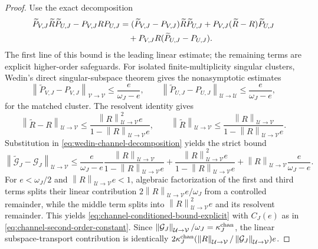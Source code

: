 \documentclass[review]{siamart220329}
\theoremstyle{definition}
\theoremstyle{remark}
\newcommand{\calU}{\mathcal{U}}
\newcommand{\calV}{\mathcal{V}}
\newcommand{\norm}[1]{\left\lVert #1\right\rVert}
\begin{document}
\begin{proof}
Use the exact decomposition
\begin{align}
\widetilde P_{V,J}\widetilde R\widetilde P_{U,J}-P_{V,J}RP_{U,J}
&=(\widetilde P_{V,J}-P_{V,J})\widetilde R\widetilde P_{U,J}
  +P_{V,J}(\widetilde R-R)\widetilde P_{U,J}  \notag\\
&\quad +P_{V,J}R(\widetilde P_{U,J}-P_{U,J}).
\label{eq:wedin-channel-decomposition}
\end{align}
The first line of this bound is the leading linear estimate; the remaining terms are explicit higher-order safeguards.
For isolated finite-multiplicity singular clusters, Wedin's direct singular-subspace theorem gives the nonasymptotic estimates
\begin{equation}
    \norm{\widetilde P_{V,J}-P_{V,J}}_{\calV\to\calV}\leq \frac{e}{\omega_J-e},
    \qquad
    \norm{\widetilde P_{U,J}-P_{U,J}}_{\calU\to\calU}\leq \frac{e}{\omega_J-e},
    \label{eq:direct-wedin-projector}
\end{equation}
for the matched cluster. The resolvent identity gives
\begin{equation}
    \norm{\widetilde R-R}_{\calU\to\calV}\leq
    \frac{\norm{R}_{\calU\to\calV}^2e}{1-\norm{R}_{\calU\to\calV}e},
    \qquad \norm{\widetilde R}_{\calU\to\calV}\leq \frac{\norm{R}_{\calU\to\calV}}{1-\norm{R}_{\calU\to\calV}e}.
    \label{eq:resolvent-nonasymptotic}
\end{equation}
Substitution in \eqref{eq:wedin-channel-decomposition} yields the strict bound
\begin{equation}
    \norm{\widetilde{\mathcal G}_J-\mathcal G_J}_{\calU\to\calV}
    \leq
    \frac{e}{\omega_J-e}\frac{\norm{R}_{\calU\to\calV}}{1-\norm{R}_{\calU\to\calV}e}
    +\frac{\norm{R}_{\calU\to\calV}^2e}{1-\norm{R}_{\calU\to\calV}e}
    +\norm{R}_{\calU\to\calV}\frac{e}{\omega_J-e}.
    \label{eq:channel-bound-nonasymptotic}
\end{equation}
For $e<\omega_J/2$ and $\norm{R}_{\calU\to\calV}e<1$, algebraic factorization of the first and third terms splits their linear contribution $2\norm{R}_{\calU\to\calV}e/\omega_J$ from a controlled remainder, while the middle term splits into $\norm{R}_{\calU\to\calV}^2e$ and its resolvent remainder. This yields \eqref{eq:channel-conditioned-bound-explicit} with $C_J(e)$ as in \eqref{eq:channel-second-order-constant}. Since $\norm{\mathcal G_J}_{\calU\to\calV}/\omega_J=\kappa_J^{\rm chan}$, the linear subspace-transport contribution is identically $2\kappa_J^{\rm chan}(\norm{R}_{\calU\to\calV}/\norm{\mathcal G_J}_{\calU\to\calV})e$.
\end{proof}
\end{document}
